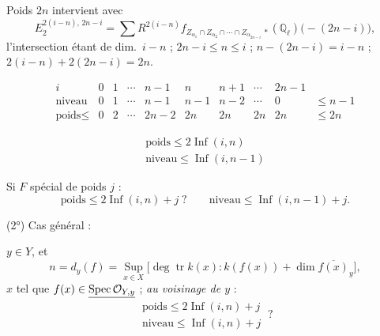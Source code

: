 \documentclass[11pt,a4paper]{article}
\begin{document}
Poids $2n$ intervient avec
\[
E_{2}^{2(i-n),\,2n-i} = \sum R^{2(i-n)}f_{Z_{\alpha_{1}} \cap Z_{\alpha_{2}}
\cap \cdots \cap Z_{\alpha_{2n-i}}\,*}(\mathbb{Q}_{\ell})\bigl(-(2n-i)\bigr),
\]
l'intersection étant de dim.\ $i-n$ ; $2n-i \leqslant n \leqslant i$ ;
$n - (2n-i) = i-n$ ; $2(i-n) + 2(2n-i) = 2n$.

\[
\begin{array}{c|c|c|c|c|c|c|c|c|l}
i & 0 & 1 & \cdots & n-1 & n & n+1 & \cdots & 2n-1 & \\
\hline
\text{niveau} & 0 & 1 & \cdots & n-1 & n-1 & n-2 & \cdots & 0 & \leqslant n-1 \\
\hline
\text{poids} \leqslant & 0 & 2 & \cdots & 2n-2 & 2n & 2n & 2n & 2n & \leqslant 2n
\end{array}
\]

\[
\boxed{\begin{array}{l}
\text{poids} \leqslant 2\operatorname{Inf}(i, n) \\
\text{niveau} \leqslant \operatorname{Inf}(i, n-1)
\end{array}}
\]

Si $F$  spécial de poids $j$ :
\[
\text{poids} \leqslant 2\operatorname{Inf}(i, n) + j \;? \qquad
\text{niveau} \leqslant \operatorname{Inf}(i, n-1) + j .
\]

(2°)  Cas général
 :


$y \in Y$, et
\[
n = d_{y}(f) = \operatorname*{Sup}_{x \in X} \bigl[\deg \operatorname{tr}
k(x) : k(f(x)) + \dim \overline{f(x)}_{y}\bigr] ,
\]
$x$ tel que $f(x) \in \uncertain{\operatorname{Spec} \mathcal{O}_{Y,y}}$ ;
\emph{au voisinage de $y$} :
\[
\boxed{\begin{array}{l}
\text{poids} \leqslant 2\operatorname{Inf}(i, n) + j \\
\text{niveau} \leqslant \operatorname{Inf}(i, n) + j
\end{array}}\ ?
\]
\end{document}
